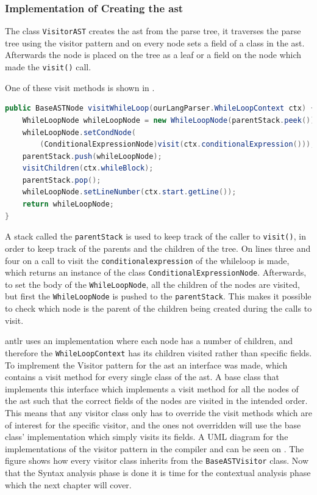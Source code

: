 \subsubsection*{Implementation of Creating the \acrshort{ast}}

The class \texttt{VisitorAST} creates the \acrshort{ast} from the parse tree, it traverses the parse tree using the visitor pattern and on every node sets a field of a class in the \acrshort{ast}. 
Afterwards the node is placed on the tree as a leaf or a field on the node which made the \texttt{visit()} call.

One of these visit methods is shown in .

\begin{lstlisting}[language=java,caption=The visit method for WhileLoopNode.,frame=tlrb,label={lst:VisitorASTCode}]
public BaseASTNode visitWhileLoop(ourLangParser.WhileLoopContext ctx) {
    WhileLoopNode whileLoopNode = new WhileLoopNode(parentStack.peek());
    whileLoopNode.setCondNode(
    	(ConditionalExpressionNode)visit(ctx.conditionalExpression()));
    parentStack.push(whileLoopNode);
    visitChildren(ctx.whileBlock);
    parentStack.pop();
    whileLoopNode.setLineNumber(ctx.start.getLine());
    return whileLoopNode;
}
\end{lstlisting}
A stack called the \texttt{parentStack} is used to keep track of the caller to \texttt{visit()}, in order to keep track of the parents and the children of the tree.
On lines three and four on  a call to visit the \texttt{conditionalexpression} of the whileloop is made, which returns an instance of the class \texttt{ConditionalExpressionNode}.
Afterwards, to set the body of the \texttt{WhileLoopNode}, all the children of the nodes are visited, but first the \texttt{WhileLoopNode} is pushed to the \texttt{parentStack}.
This makes it possible to check which node is the parent of the children being created during the calls to visit.

\acrshort{antlr} uses an implementation where each node has a number of children, and therefore the \texttt{WhileLoopContext} has its children visited rather than specific fields.
To implrement the Visitor pattern for the \acrshort{ast} an interface was made, which contains a visit method for every single class of the \acrshort{ast}.
A base class that implements this interface which implements a visit method for all the nodes of the \acrshort{ast} such that the correct fields of the nodes are visited in the intended order.
This means that any visitor class only has to override the visit methods which are of interest for the specific visitor, and the ones not overridden will use the base class' implementation which simply visits its fields.
A UML diagram for the implementations of the visitor pattern in the compiler and can be seen on .
The figure shows how every visitor class inherits from the \texttt{BaseASTVisitor} class.
Now that the Syntax analysis phase is done it is time for the contextual analysis phase which the next chapter will cover.

